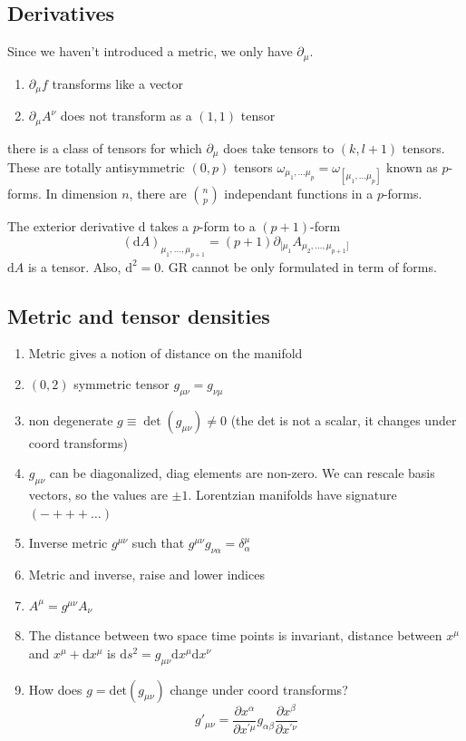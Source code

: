 \documentclass[a4paper]{book}
\theoremstyle{definition}
\theoremstyle{remark}
\begin{document}
\subsection{Derivatives}
Since we haven't introduced a metric, we only have $\partial_\mu$.
\begin{enumerate}
    \item $\partial_\mu f$ transforms like a vector 
    \item $\partial_\mu A^\nu$ does not transform as a $(1, 1)$ tensor 
\end{enumerate}
there is a class of tensors for which $\partial_\mu$ does take tensors to $(k, l+1)$ tensors. These are totally antisymmetric $(0, p)$ tensors $\omega_{\mu_1, \dots \mu_p} = \omega_{[\mu_1, \dots \mu_p]}$ known as $p$-forms. In dimension $n$, there are $\binom{n}{p}$ independant functions in a $p$-forms. \par \medskip 
The exterior derivative $\text{d}$ takes a $p$-form to a $(p+1)$-form 
\begin{equation}
    (\text{d}A)_{\mu_1,\dots,\mu_{p+1}} = (p+1)\partial_{[\mu_1}A_{\mu_2, \dots, \mu_{p+1}]}
\end{equation}
$\text{d}A$ is a tensor. Also, $\text{d}^2 = 0$. GR cannot be only formulated in term of forms. 

\subsection{Metric and tensor densities}
\begin{enumerate}
    \item Metric gives a notion of distance on the manifold 
    \item $(0, 2)$ symmetric tensor $g_{\mu\nu} = g_{\nu\mu}$
    \item non degenerate $g \equiv \det(g_{\mu\nu}) \neq 0$ (the det is not a scalar, it changes under coord transforms)
    \item $g_{\mu\nu}$ can be diagonalized, diag elements are non-zero. We can rescale basis vectors, so the values are $\pm1$. Lorentzian manifolds have signature $(-+++\dots)$ 
    \item Inverse metric $g^{\mu\nu}$ such that $g^{\mu\nu}g_{\nu\alpha} = \delta^\mu_\alpha$
    \item Metric and inverse, raise and lower indices 
    \item $A^\mu = g^{\mu\nu}A_\nu$
    \item The distance between two space time points is invariant, distance between $x^\mu$ and $x^\mu + \text{d}x^\mu$ is $\text{d}s^2 = g_{\mu\nu}\text{d}x^\mu \text{d}x^\nu$
    \item How does $g = \text{det}(g_{\mu\nu})$ change under coord transforms? 
    \begin{equation}
        g'_{\mu\nu} = \frac{\partial x^{\alpha}}{\partial x^{'\mu}}g_{\alpha\beta} \frac{\partial x^\beta}{\partial x^{'\nu}}
    \end{equation}
\end{enumerate}
\end{document}
